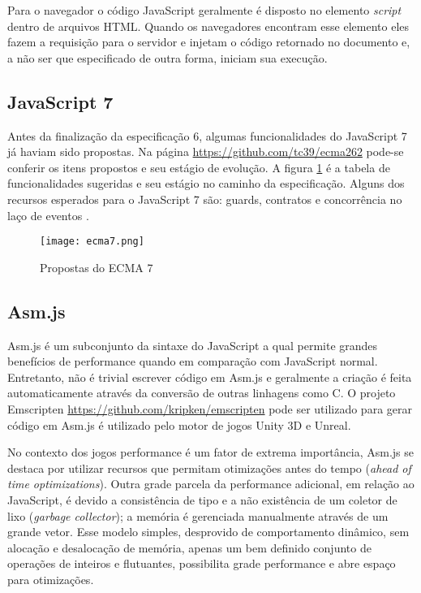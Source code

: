 Para o navegador o código JavaScript geralmente é disposto no elemento
\textit{script} dentro de arquivos HTML. Quando os navegadores encontram esse
elemento eles fazem a requisição para o servidor e injetam o código
retornado no documento e, a não ser que especificado de outra forma,
iniciam sua execução.

\subsection{JavaScript 7}

Antes da finalização da especificação 6, algumas funcionalidades
do JavaScript 7 já haviam sido propostas. Na página
\url{https://github.com/tc39/ecma262} pode-se conferir os itens
propostos e seu estágio de evolução. A figura \ref{fig:ecma7} é
a tabela de funcionalidades sugeridas e seu estágio no caminho da
especificação. Alguns dos recursos esperados para o JavaScript 7 são:
guards, contratos e concorrência no laço de eventos \autocite{ecma7}.

\begin{figure}[H]
    \centering
    \texttt{[image: ecma7.png]}
	\caption{Propostas do ECMA 7}
    \label{fig:ecma7}
\end{figure}

\subsection{Asm.js}

Asm.js é um subconjunto da sintaxe do JavaScript a qual permite
grandes benefícios de performance quando em comparação com
JavaScript normal. Entretanto, não é trivial escrever código em
Asm.js e geralmente a criação é feita automaticamente através
da conversão de outras linhagens como C. O projeto Emscripten
\url{https://github.com/kripken/emscripten} pode ser utilizado para gerar
código em Asm.js é utilizado pelo motor de jogos Unity 3D e Unreal.

No contexto dos jogos performance é um fator de extrema importância,
Asm.js se destaca por utilizar recursos que permitam otimizações
antes do tempo (\textit{ahead of time optimizations}). Outra grade
parcela da performance adicional, em relação ao JavaScript, é
devido a consistência de tipo e a não existência de um coletor de
lixo (\textit{garbage collector}); a memória é gerenciada manualmente
através de um grande vetor. Esse modelo simples, desprovido de
comportamento dinâmico, sem alocação e desalocação de memória,
apenas um bem definido conjunto de operações de inteiros e flutuantes,
possibilita grade performance e abre espaço para otimizações.

